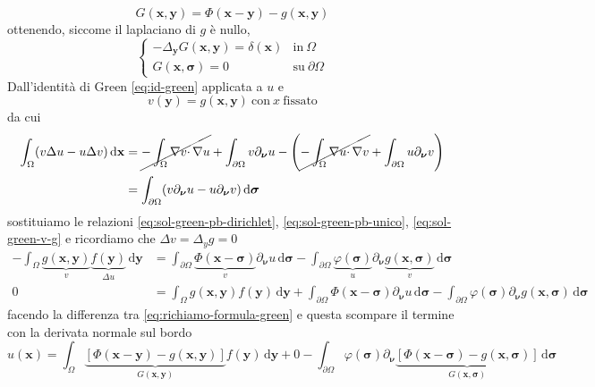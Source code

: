 \documentclass[10pt,a4paper,twoside,openright]{book}
\newcommand{\x}{\mathbf{x}}
\newcommand{\y}{\mathbf{y}}
\newcommand{\sigg}{\bm{\sigma}}
\newcommand{\nuu}{\bm{\nu}}
\newcommand{\de}{\,\mathrm d}
\newcommand{\dxx}{\de \x}
\newcommand{\dyy}{\de \y}
\newcommand{\dsig}{\de \sigg}
\begin{document}
\begin{equation*}
    \boxed{G(\x,\y) =\Phi (\x-\y) -g(\x,\y)}
\end{equation*}
ottenendo, siccome il laplaciano di $g$ è nullo,
\begin{equation*}
    \begin{cases}
        -\Delta _{\y} G(\x,\y) =\delta (\x) & \text{in} \ \Omega          \\
        G(\x,\sigg) =0                      & \text{su} \ \partial \Omega
    \end{cases}
\end{equation*}
Dall'identità di Green \eqref{eq:id-green} applicata a $u$ e
\begin{equation}
    v(\y) =g(\x,\y) \ \text{con} \ x\ \text{fissato}
    \label{eq:sol-green-v-g}
\end{equation}
da cui
\begin{align*}
    \int _{\Omega }(v\Delta u-u\Delta v) \dxx & =\cancel{-\int _{\Omega } \nabla v\cdotp \nabla u} +\int _{\partial \Omega } v\partial _{\nuu} u-\left(\cancel{-\int _{\Omega } \nabla u\cdotp \nabla v} +\int _{\partial \Omega } u\partial _{\nuu} v\right) \\
                                              & =\int _{\partial \Omega }(v\partial _{\nuu} u-u\partial _{\nuu} v) \dsig
\end{align*}
sostituiamo le relazioni \eqref{eq:sol-green-pb-dirichlet}, \eqref{eq:sol-green-pb-unico}, \eqref{eq:sol-green-v-g} e ricordiamo che $\Delta v=\Delta _{y} g=0$
\begin{align*}
    -\int _{\Omega } \underbrace{g(\x,\y)}_{v} \underbrace{f(\y)}_{\Delta u} \dyy & =\int _{\partial \Omega } \underbrace{\Phi (\x-\sigg)}_{v} \partial _{\nuu} u\dsig -\int _{\partial \Omega } \underbrace{\varphi (\sigg)}_{u} \partial _{\nuu} \underbrace{g(\x,\sigg)}_{v} \dsig \\
    0                                                                             & =\int _{\Omega } g(\x,\y) f(\y) \dyy+\int _{\partial \Omega } \Phi (\x-\sigg) \partial _{\nuu} u\dsig -\int _{\partial \Omega } \varphi (\sigg) \partial _{\nuu} g(\x,\sigg) \dsig
\end{align*}
facendo la differenza tra \eqref{eq:richiamo-formula-green} e questa scompare il termine con la derivata normale sul bordo
\begin{equation*}
    u(\x) =\int _{\Omega }\underbrace{[ \Phi (\x-\y) -g(\x,\y)]}_{G(\x,\y)} f(\y) \dyy+0-\int _{\partial \Omega } \varphi (\sigg) \partial_{\nuu}\underbrace{[ \Phi (\x-\sigg) -g(\x,\sigg)]}_{G(\x,\sigg)} \dsig
\end{equation*}
\end{document}
